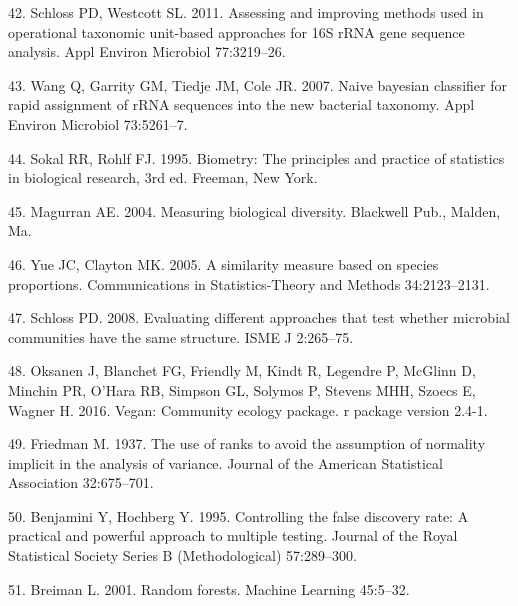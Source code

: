 \documentclass[11pt,]{article}
\begin{document}
\hypertarget{ref-schloss_OTUanalysis_2011}{}
42. Schloss PD, Westcott SL. 2011. Assessing and improving methods used
in operational taxonomic unit-based approaches for 16S rRNA gene
sequence analysis. Appl Environ Microbiol 77:3219--26.

\hypertarget{ref-wang_taxonomy_2007}{}
43. Wang Q, Garrity GM, Tiedje JM, Cole JR. 2007. Naive bayesian
classifier for rapid assignment of rRNA sequences into the new bacterial
taxonomy. Appl Environ Microbiol 73:5261--7.

\hypertarget{ref-sokal_biometrystats_1995}{}
44. Sokal RR, Rohlf FJ. 1995. Biometry: The principles and practice of
statistics in biological research, 3rd ed. Freeman, New York.

\hypertarget{ref-magurran_measuring_2004}{}
45. Magurran AE. 2004. Measuring biological diversity. Blackwell Pub.,
Malden, Ma.

\hypertarget{ref-yue_thetaYC_2005}{}
46. Yue JC, Clayton MK. 2005. A similarity measure based on species
proportions. Communications in Statistics-Theory and Methods
34:2123--2131.

\hypertarget{ref-schloss_commstruct_2008}{}
47. Schloss PD. 2008. Evaluating different approaches that test whether
microbial communities have the same structure. ISME J 2:265--75.

\hypertarget{ref-oksanen_vegan_2016}{}
48. Oksanen J, Blanchet FG, Friendly M, Kindt R, Legendre P, McGlinn D,
Minchin PR, O'Hara RB, Simpson GL, Solymos P, Stevens MHH, Szoecs E,
Wagner H. 2016. Vegan: Community ecology package. r package version
2.4-1.

\hypertarget{ref-friedman_1937}{}
49. Friedman M. 1937. The use of ranks to avoid the assumption of
normality implicit in the analysis of variance. Journal of the American
Statistical Association 32:675--701.

\hypertarget{ref-Benjamini_Hochberg_1995}{}
50. Benjamini Y, Hochberg Y. 1995. Controlling the false discovery rate:
A practical and powerful approach to multiple testing. Journal of the
Royal Statistical Society Series B (Methodological) 57:289--300.

\hypertarget{ref-breiman_rf_2001}{}
51. Breiman L. 2001. Random forests. Machine Learning 45:5--32.
\end{document}
